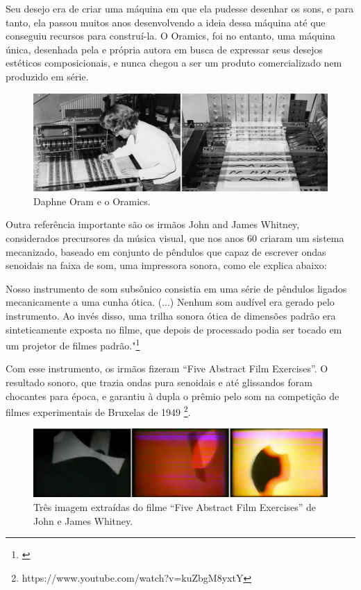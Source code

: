 Seu desejo era de criar uma máquina em que ela pudesse desenhar os sons, e para tanto, ela passou muitos anos desenvolvendo a ideia dessa máquina até que conseguiu recursos para construí-la. O Oramics, foi no entanto, uma máquina única, desenhada pela e própria autora em busca de expressar seus desejos estéticos composicionais, e nunca chegou a ser um produto comercializado nem produzido em série.   

\begin{figure}
    \caption{\label{oram}Daphne Oram e o Oramics.}
    
        \includegraphics[width=1\linewidth]{pictures/cap2/oramics}
    
\end{figure}


Outra referência importante são os irmãos John and James Whitney, considerados precursores da música visual, que nos anos 60 criaram um sistema mecanizado, baseado em conjunto de pêndulos que capaz de escrever ondas senoidais na faixa de som, uma impressora sonora, como ele explica abaixo:

\begin{citacao}
Nosso instrumento de som subsônico consistia em uma série de pêndulos ligados mecanicamente a uma cunha ótica. (...) Nenhum som audível era gerado pelo instrumento. Ao invés disso, uma trilha sonora ótica de dimensões padrão era sinteticamente exposta no filme, que depois de processado podia ser tocado em um projetor de filmes padrão."\footnote{\cite[152]{Whitney1980}} 
\end{citacao}

Com esse instrumento, os irmãos fizeram ``Five Abstract Film Exercises''. O resultado sonoro, que trazia ondas pura senoidais e até glissandos foram chocantes para época, e garantiu à dupla o prêmio pelo som na competição de filmes experimentais de Bruxelas de 1949 \footnote{https://www.youtube.com/watch?v=kuZbgM8yxtY}.

\begin{figure}
    \caption{\label{witney}Três imagem extraídas do filme ``Five Abstract Film Exercises'' de John e James Whitney.}
    
        \includegraphics[width=1\linewidth]{pictures/cap2/witney}
    
\end{figure}

